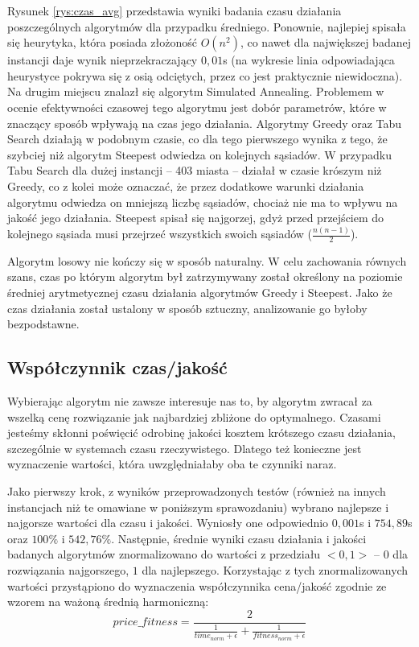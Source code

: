 Rysunek \ref{rys:czas_avg} przedstawia wyniki badania czasu działania poszczególnych algorytmów dla przypadku średniego. Ponownie, najlepiej spisała się heurytyka, która posiada złożoność $O(n^2)$, co nawet dla największej badanej instancji daje wynik nieprzekraczający $0,01$s (na wykresie linia odpowiadająca heurystyce pokrywa się z osią odciętych, przez co jest praktycznie niewidoczna). Na drugim miejscu znalazł się algorytm Simulated Annealing. Problemem w ocenie efektywności czasowej tego algorytmu jest dobór parametrów, które w znaczący sposób wpływają na czas jego działania. Algorytmy Greedy oraz Tabu Search działają w podobnym czasie, co dla tego pierwszego wynika z tego, że szybciej niż algorytm Steepest odwiedza on kolejnych sąsiadów. W przypadku Tabu Search dla dużej instancji -- 403 miasta -- działał w czasie krószym niż Greedy, co z kolei może oznaczać, że przez dodatkowe warunki działania algorytmu odwiedza on mniejszą liczbę sąsiadów, chociaż nie ma to wpływu na jakość jego działania. Steepest spisał się najgorzej, gdyż przed przejściem do kolejnego sąsiada musi przejrzeć wszystkich swoich sąsiadów ($\frac{n(n-1)}{2}$).

Algorytm losowy nie kończy się w sposób naturalny. W celu zachowania równych szans, czas po którym algorytm był zatrzymywany został określony na poziomie średniej arytmetycznej czasu działania algorytmów Greedy i Steepest. Jako że czas działania został ustalony w sposób sztuczny, analizowanie go byłoby bezpodstawne.

\subsection{Współczynnik czas/jakość}
Wybierając algorytm nie zawsze interesuje nas to, by algorytm zwracał za wszelką cenę rozwiązanie jak najbardziej zbliżone do optymalnego. Czasami jesteśmy skłonni poświęcić odrobinę jakości kosztem krótszego czasu działania, szczególnie w systemach czasu rzeczywistego. Dlatego też konieczne jest wyznaczenie wartości, która uwzględniałaby oba te czynniki naraz.

Jako pierwszy krok, z wyników przeprowadzonych testów (również na innych instancjach niż te omawiane w poniższym sprawozdaniu) wybrano najlepsze i najgorsze wartości dla czasu i jakości. Wyniosły one odpowiednio $0,001$s i $754,89$s oraz $100\%$ i $542,76\%$. Następnie, średnie wyniki czasu działania i jakości badanych algorytmów znormalizowano do wartości z przedziału $<0,1>$ -- $0$ dla rozwiązania najgorszego, $1$ dla najlepszego. Korzystając z tych znormalizowanych wartości przystąpiono do wyznaczenia współczynnika cena/jakość zgodnie ze wzorem na ważoną średnią harmoniczną:
\begin{equation*}
price\_fitness = \frac{2}{\frac{1}{time_{norm} + \epsilon} + \frac{1}{fitness_{norm} + \epsilon} }
\end{equation*}

